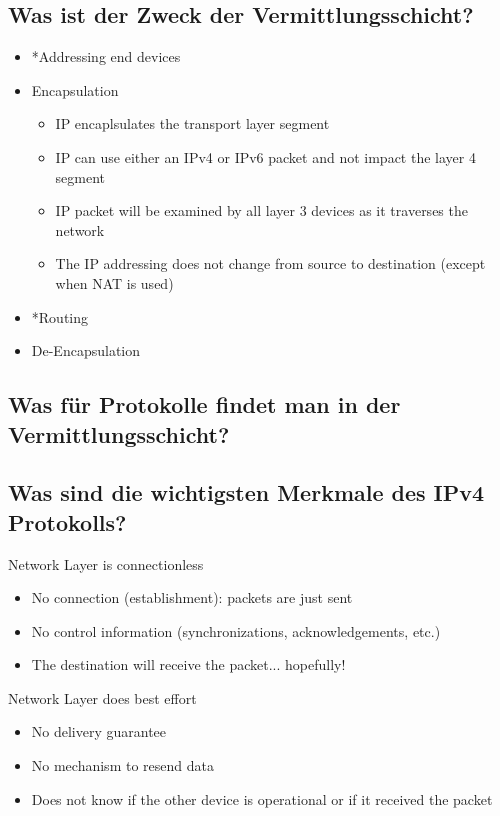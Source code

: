 \subsection*{Was ist der Zweck der Vermittlungsschicht?}
\begin{itemize}
    \item *Addressing end devices
    \item Encapsulation
    \begin{itemize}
        \item IP encaplsulates the transport layer segment
        \item IP can use either an IPv4 or IPv6 packet and not impact the layer 4 segment
        \item IP packet will be examined by all layer 3 devices as it traverses the network
        \item The IP addressing does not change from source to destination (except when NAT is used)
    \end{itemize}
    \item *Routing
    \item De-Encapsulation
\end{itemize}

\subsection*{Was für Protokolle findet man in der Vermittlungsschicht?}
\subsection*{Was sind die wichtigsten Merkmale des IPv4 Protokolls?}
Network Layer is connectionless
\begin{itemize}
    \item No connection (establishment): packets are just sent
    \item No control information (synchronizations, acknowledgements, etc.)
    \item The destination will receive the packet... hopefully!
\end{itemize}

Network Layer does best effort
\begin{itemize}
    \item No delivery guarantee
    \item No mechanism to resend data
    \item Does not know if the other device is operational or if it received the packet
\end{itemize}

